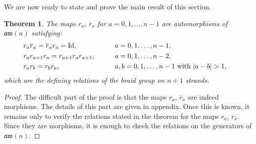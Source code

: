 \documentclass[10pt,a4paper]{amsart}
\numberwithin{equation}{section}
\newtheorem{theo}{Theorem}[section]
\theoremstyle{definition}
\newcommand{\rb}{\overline{r}}
\newcommand{\aw}{\mathfrak{aw}(n)}
\begin{document}
We are now ready to state and prove the main result of this section.

\begin{theo}\label{theo-matricesR}
The maps $r_a$, $\rb_a$ for $a=0,1,\dots,n-1$ are automorphisms of $\aw$ satisfying:
\begin{alignat*}{3}
&r_a\rb_a=\rb_ar_a={\rm Id} , && a=0,1,\dots,n-1, &\\
&r_ar_{a+1}r_a=r_{a+1}r_ar_{a+1} ,\qquad && a=0,1,\dots,n-2, &\\
&r_ar_b=r_br_a , && a,b=0,1,\dots,n-1\ \text{with}\ |a-b|>1 , &
\end{alignat*}
which are the defining relations of the braid group on $n+1$ strands.
\end{theo}

\begin{proof}
The difficult part of the proof is that the maps $r_a$, $\rb_a$ are indeed morphisms. The details of this part are given in appendix. Once this is known, it remains only to verify the relations stated in the theorem for the maps $r_a$, $\rb_a$. Since they are morphisms, it is enough to check the relations on the generators of $\aw$.


\end{proof}
\end{document}

